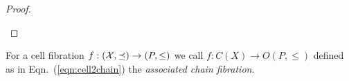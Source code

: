 \begin{proof}
\begin{enumerate}
\end{enumerate}  

%
%
%
%
%
%
%
 



\end{proof}
 
 For a cell fibration $f:({\mathcal X},\preceq)\to (P,\leq)$ we call $f:C(X)\to O(P,\leq)$ defined as in Eqn.~(\ref{eqn:cell2chain}) the {\em associated chain fibration}.





%
%
%



